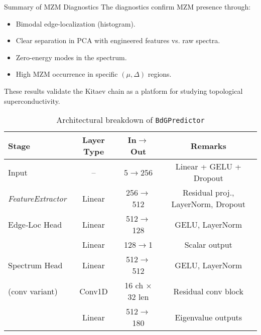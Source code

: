 \documentclass[aspectratio=169]{beamer}
\begin{document}
\begin{frame}{Summary of MZM Diagnostics}
The diagnostics confirm MZM presence through:
\begin{itemize}
\item Bimodal edge-localization (histogram).
\item Clear separation in PCA with engineered features vs. raw spectra.
\item Zero-energy modes in the spectrum.
\item High MZM occurrence in specific $(\mu, \Delta)$ regions.
\end{itemize}
These results validate the Kitaev chain as a platform for studying topological superconductivity.
\end{frame}


\usepackage{booktabs}

\begin{table}[]
  \centering
  \caption{Architectural breakdown of \texttt{BdGPredictor}}
  \label{tab:enhanced-architecture}
  \begin{tabular}{@{}lccc@{}}
    \toprule
    \textbf{Stage}          & \textbf{Layer Type}   & \textbf{In\(\to\)Out} & \textbf{Remarks}                  \\
    \midrule
    Input                   & –                     & 5\(\to\)256           & Linear + GELU + Dropout          \\
    \emph{FeatureExtractor} & Linear                & 256\(\to\)512         & Residual proj., LayerNorm, Dropout \\
    \midrule
    Edge‐Loc Head           & Linear                & 512\(\to\)128         & GELU, LayerNorm                  \\
                            & Linear                & 128\(\to\)1           & Scalar output                    \\
    \midrule
    Spectrum Head           & Linear                & 512\(\to\)512         & GELU, LayerNorm                  \\
    (conv variant)          & Conv1D                & 16 ch × 32 len        & Residual conv block              \\
                            & Linear                & 512\(\to\)180         & Eigenvalue outputs               \\
    \bottomrule
  \end{tabular}
\end{table}



\end{document}
